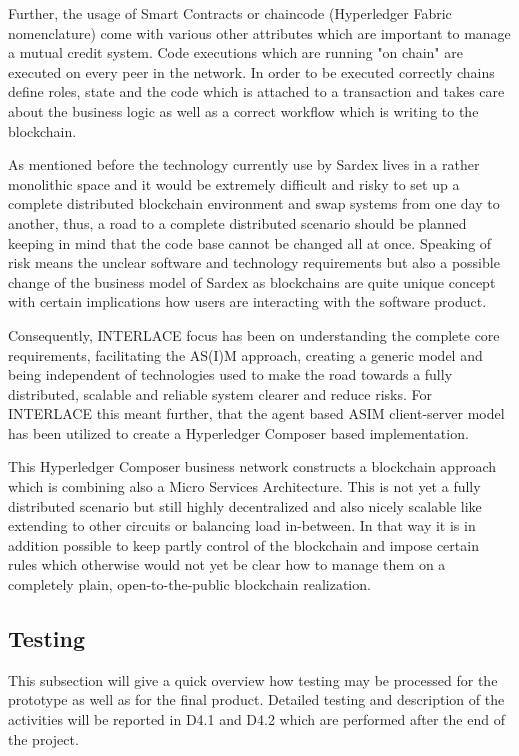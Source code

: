 Further, the usage of Smart Contracts or chaincode (Hyperledger Fabric nomenclature) come with various other attributes which are important to manage a mutual credit system. Code executions which are running "on chain" are executed on every peer in the network. In order to be executed correctly chains define roles, state and the code which is attached to a transaction and takes care about the business logic as well as a correct workflow which is writing to the blockchain.

As mentioned before the technology currently use by Sardex lives in a rather monolithic space and it would be extremely difficult and risky to set up a complete distributed blockchain environment and swap systems from one day to another, thus, a road to a complete distributed scenario should be planned keeping in mind that the code base cannot be changed all at once. Speaking of risk means the unclear software and technology requirements but also a possible change of the business model of Sardex as blockchains are quite unique concept with certain implications how users are interacting with the software product.

Consequently, INTERLACE focus has been on understanding the complete core requirements, facilitating the AS(I)M approach, creating a generic model and being independent of technologies used to make the road towards a fully distributed, scalable and reliable system clearer and reduce risks. For INTERLACE this meant further, that the agent based ASIM client-server model has been utilized to create a Hyperledger Composer based implementation.

This Hyperledger Composer business network constructs a blockchain approach which is combining also a Micro Services Architecture. This is not yet a fully distributed scenario but still highly decentralized and also nicely scalable like extending to other circuits or balancing load in-between. In that way it is in addition possible to keep partly control of the blockchain and impose certain rules which otherwise would not yet be clear how to manage them on a completely plain, open-to-the-public blockchain realization.

\subsection{Testing}

This subsection will give a quick overview how testing may be processed for the prototype as well as for the final product. Detailed testing and description of the activities will be reported in D4.1 and D4.2 which are performed after the end of the project.

